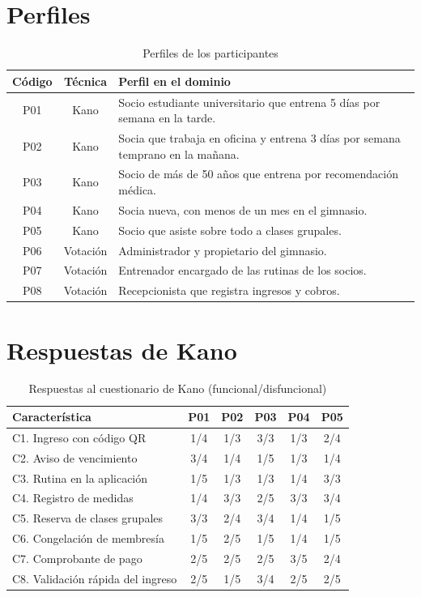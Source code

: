 \appendices
\renewcommand{\appendixname}{Anexo}

\section{Perfiles}

\begin{table}[H]
\centering\footnotesize
\caption{Perfiles de los participantes}\label{tab:perfiles}
\begin{tabularx}{\textwidth}{@{}ccY@{}}
\toprule
\textbf{Código} & \textbf{Técnica} & \textbf{Perfil en el dominio}\\
\midrule
P01 & Kano & Socio estudiante universitario que entrena 5 días por semana en la tarde.\\
P02 & Kano & Socia que trabaja en oficina y entrena 3 días por semana temprano en la mañana.\\
P03 & Kano & Socio de más de 50 años que entrena por recomendación médica.\\
P04 & Kano & Socia nueva, con menos de un mes en el gimnasio.\\
P05 & Kano & Socio que asiste sobre todo a clases grupales.\\
P06 & Votación & Administrador y propietario del gimnasio.\\
P07 & Votación & Entrenador encargado de las rutinas de los socios.\\
P08 & Votación & Recepcionista que registra ingresos y cobros.\\
\bottomrule
\end{tabularx}
\end{table}

\section{Respuestas de Kano}

\begin{table}[H]
\centering\footnotesize
\caption{Respuestas al cuestionario de Kano (funcional/disfuncional)}\label{tab:respuestas-kano}
\begin{tabular}{@{}lccccc@{}}
\toprule
\textbf{Característica} & \textbf{P01} & \textbf{P02} & \textbf{P03} & \textbf{P04} & \textbf{P05}\\
\midrule
C1. Ingreso con código QR & 1/4 & 1/3 & 3/3 & 1/3 & 2/4\\
C2. Aviso de vencimiento & 3/4 & 1/4 & 1/5 & 1/3 & 1/4\\
C3. Rutina en la aplicación & 1/5 & 1/3 & 1/3 & 1/4 & 3/3\\
C4. Registro de medidas & 1/4 & 3/3 & 2/5 & 3/3 & 3/4\\
C5. Reserva de clases grupales & 3/3 & 2/4 & 3/4 & 1/4 & 1/5\\
C6. Congelación de membresía & 1/5 & 2/5 & 1/5 & 1/4 & 1/5\\
C7. Comprobante de pago & 2/5 & 2/5 & 2/5 & 3/5 & 2/4\\
C8. Validación rápida del ingreso & 2/5 & 1/5 & 3/4 & 2/5 & 2/5\\
\bottomrule
\end{tabular}
\end{table}

